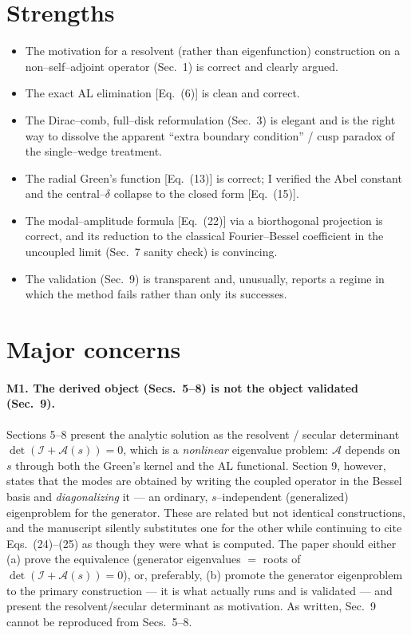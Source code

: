 \documentclass{article}
\begin{document}
\section{Strengths}
\begin{itemize}[leftmargin=1.4em]
\item The motivation for a resolvent (rather than eigenfunction) construction on a
non--self--adjoint operator (Sec.~1) is correct and clearly argued.
\item The exact AL elimination [Eq.~(6)] is clean and correct.
\item The Dirac--comb, full--disk reformulation (Sec.~3) is elegant and is the
right way to dissolve the apparent ``extra boundary condition'' / cusp paradox of
the single--wedge treatment.
\item The radial Green's function [Eq.~(13)] is correct; I verified the Abel
constant and the central--$\delta$ collapse to the closed form [Eq.~(15)].
\item The modal--amplitude formula [Eq.~(22)] via a biorthogonal projection is
correct, and its reduction to the classical Fourier--Bessel coefficient in the
uncoupled limit (Sec.~7 sanity check) is convincing.
\item The validation (Sec.~9) is transparent and, unusually, reports a regime in
which the method fails rather than only its successes.
\end{itemize}

\section{Major concerns}

\paragraph{M1. The derived object (Secs.~5--8) is not the object validated
(Sec.~9).}
Sections 5--8 present the analytic solution as the resolvent / secular determinant
$\det(\mathcal I + \mathcal A(s)) = 0$, which is a \emph{nonlinear} eigenvalue
problem: $\mathcal A$ depends on $s$ through both the Green's kernel and the AL
functional. Section 9, however, states that the modes are obtained by writing the
coupled operator in the Bessel basis and \emph{diagonalizing} it --- an ordinary,
$s$--independent (generalized) eigenproblem for the generator. These are related
but not identical constructions, and the manuscript silently substitutes one for
the other while continuing to cite Eqs.~(24)--(25) as though they were what is
computed. The paper should either (a) prove the equivalence (generator
eigenvalues $=$ roots of $\det(\mathcal I+\mathcal A(s))=0$), or, preferably,
(b) promote the generator eigenproblem to the primary construction --- it is what
actually runs and is validated --- and present the resolvent/secular determinant
as motivation. As written, Sec.~9 cannot be reproduced from Secs.~5--8.
\end{document}
